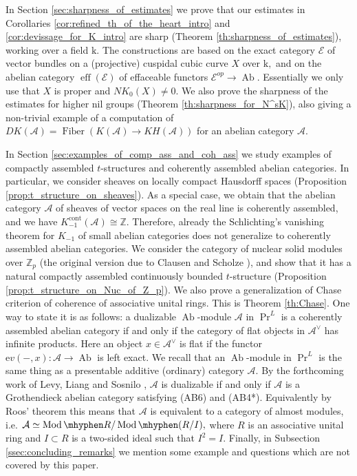 \documentclass[11pt,leqno]{amsart}
\numberwithin{equation}{section}
\def\Z{\mathbb{Z}}
\newcommand{\hy}{\mhyphen}
\newcommand{\Fiber}{\operatorname{Fiber}}
\newcommand{\cont}{\operatorname{cont}}
\newcommand{\eff}{\operatorname{eff}}
\newcommand{\mk}{\mathrm k}
\newcommand{\ev}{\mathrm ev}
\newcommand{\cA}{{\mathcal A}}
\newcommand{\cE}{{\mathcal E}}
\newcommand{\Ab}{\operatorname{Ab}}
\newcommand{\Mod}{\operatorname{Mod}}
\begin{document}
In Section \ref{sec:sharpness_of_estimates} we prove that our estimates in Corollaries \ref{cor:refined_th_of_the_heart_intro} and \ref{cor:devissage_for_K_intro} are sharp (Theorem \ref{th:sharpness_of_estimates}), working over a field $\mk.$ The constructions are based on the exact category $\cE$ of vector bundles on a (projective) cuspidal cubic curve $X$ over $\mk,$ and on the abelian category $\eff(\cE)$ of effaceable functors $\cE^{op}\to\Ab.$ Essentially we only use that $X$ is proper and $NK_0(X)\ne 0.$ We also prove the sharpness of the estimates for higher nil groups (Theorem \ref{th:sharpness_for_N^sK}), also giving a non-trivial example of a computation of $DK(\cA)=\Fiber(K(\cA)\to KH(\cA))$ for an abelian category $\cA.$

In Section \ref{sec:examples_of_comp_ass_and_coh_ass} we study examples of compactly assembled $t$-structures and coherently assembled abelian categories. In particular, we consider sheaves on locally compact Hausdorff spaces (Proposition \ref{prop:t_structure_on_sheaves}). As a special case, we obtain that the abelian category $\cA$ of sheaves of vector spaces on the real line is coherently assembled, and we have $K_{-1}^{\cont}(\cA)\cong\Z.$ Therefore, already the Schlichting's vanishing theorem for $K_{-1}$ of small abelian categories \cite[Theorem 6]{Sch06} does not generalize to coherently assembled abelian categories. We consider the category of nuclear solid modules over $\Z_p$ (the original version due to Clausen and Scholze \cite{CS20}), and show that it has a natural compactly assembled continuously bounded $t$-structure (Proposition \ref{prop:t_structure_on_Nuc_of_Z_p}). We also prove a generalization of Chase criterion \cite{Ch60} of coherence of associative unital rings. This is Theorem \ref{th:Chase}. One way to state it is as follows: a dualizable $\Ab$-module $\cA$ in $\Pr^L$ is a coherently assembled abelian category if and only if the category of flat objects in $\cA^{\vee}$ has infinite products. Here an object $x\in\cA^{\vee}$ is flat if the functor $\ev(-,x):\cA\to\Ab$ is left exact. We recall that an $\Ab$-module in $\Pr^L$ is the same thing as a presentable additive (ordinary) category $\cA.$ By the forthcoming work of Levy, Liang and Sosnilo \cite{LLS}, $\cA$ is dualizable if and only if $\cA$ is a Grothendieck abelian category satisfying (AB6) and (AB4*). Equivalently by Roos' theorem \cite{Roo65} this means that $\cA$ is equivalent to a category of almost modules, i.e. $\cA\simeq\Mod\hy R/\Mod\hy(R/I),$ where $R$ is an associative unital ring and $I\subset R$ is a two-sided ideal such that $I^2=I.$ Finally, in Subsection \ref{ssec:concluding_remarks} we mention some example and questions which are not covered by this paper.
\end{document}
